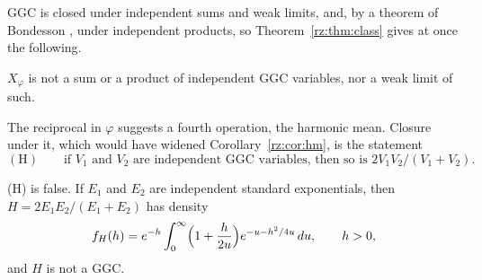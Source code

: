 GGC is closed under independent sums and weak limits, and, by a theorem of Bondesson \cite{Bond2015}, under independent products, so Theorem~\ref{rz:thm:class} gives at once the following.

\begin{corollary}\label{rz:cor:hm}
$X_\varphi$ is not a sum or a product of independent GGC variables, nor a weak limit of such.
\end{corollary}

The reciprocal in $\varphi$ suggests a fourth operation, the harmonic mean. Closure under it, which would have widened Corollary~\ref{rz:cor:hm}, is the statement
\[
\mathrm{(H)}\qquad\text{if $V_1$ and $V_2$ are independent GGC variables, then so is $2V_1V_2/(V_1+V_2)$.}
\]

\begin{proposition}\label{rz:prop:hmfalse}
(H) is false. If $E_1$ and $E_2$ are independent standard exponentials, then $H=2E_1E_2/(E_1+E_2)$ has density
\[
f_H(h)=e^{-h}\int_0^\infty\Bigl(1+\frac h{2u}\Bigr)e^{-u-h^2/4u}\,du,\qquad h>0,
\]
and $H$ is not a GGC.
\end{proposition}

